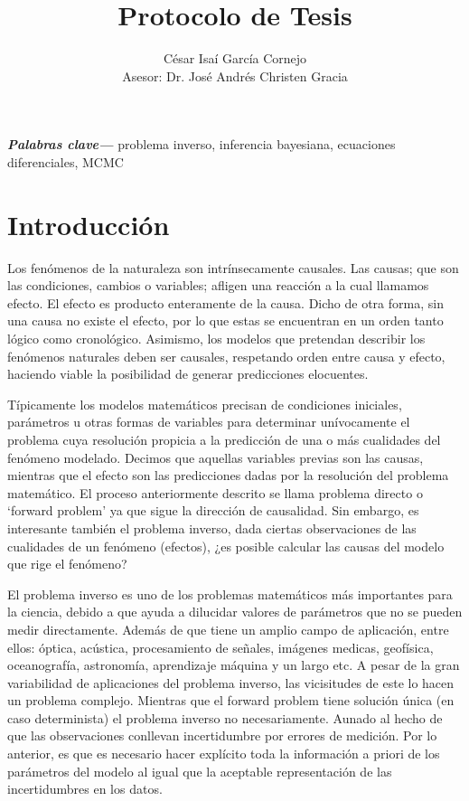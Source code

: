 \documentclass{article}
\title{Protocolo de Tesis}
\author{César Isaí García Cornejo \\
Asesor: Dr. José Andrés Christen Gracia}
\providecommand{\keywords}[1]
{
  \small	
  \textbf{\textit{Palabras clave---}} #1
}
\begin{document}
\maketitle

\keywords{problema inverso, inferencia bayesiana, ecuaciones diferenciales, MCMC}

\section*{Introducción}

Los fenómenos de la naturaleza son intrínsecamente causales. Las causas; que son las condiciones, cambios o variables; afligen una reacción a la cual llamamos efecto. El efecto es producto enteramente de la causa. Dicho de otra forma, sin una causa no existe el efecto, por lo que estas se encuentran en un orden tanto lógico como cronológico. Asimismo, los modelos que pretendan describir los fenómenos naturales deben ser causales, respetando orden entre causa y efecto, haciendo viable la posibilidad de generar predicciones elocuentes. 

Típicamente los modelos matemáticos precisan de condiciones iniciales, parámetros u otras formas de variables para determinar unívocamente el problema cuya resolución propicia a la predicción de una o más cualidades del fenómeno modelado. Decimos que aquellas variables previas son las causas, mientras que el efecto son las predicciones dadas por la resolución del problema matemático.
El proceso anteriormente descrito se llama problema directo o `forward problem' ya que sigue la dirección de causalidad. Sin embargo, es interesante también el problema inverso, dada ciertas observaciones de las cualidades de un fenómeno (efectos), ¿es posible calcular las causas del modelo que rige el fenómeno?

El problema inverso es uno de los problemas matemáticos más importantes para la ciencia, debido a que ayuda a dilucidar valores de parámetros que no se pueden medir directamente. Además de que tiene un amplio campo de aplicación, entre ellos: óptica, acústica, procesamiento de señales, imágenes medicas, geofísica, oceanografía, astronomía, aprendizaje máquina y un largo etc. A pesar de la gran variabilidad de aplicaciones del problema inverso, las vicisitudes de este lo hacen un problema complejo. Mientras que el forward problem tiene solución única (en caso determinista) el problema inverso no necesariamente. Aunado al hecho de que las observaciones conllevan incertidumbre por errores de medición. Por lo anterior, es que es necesario hacer explícito toda la información a priori de los parámetros del modelo al igual que la aceptable representación de las incertidumbres en los datos.
\end{document}
